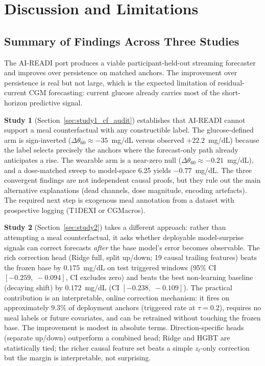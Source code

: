 \section{Discussion and Limitations}
\label{sec:discuss}

\subsection{Summary of Findings Across Three Studies}
\label{subsec:discuss_summary}

The AI-READI port produces a viable participant-held-out streaming forecaster
and improves over persistence on matched anchors.
The improvement over persistence is real but not large, which is the expected
limitation of residual-current CGM forecasting: current glucose already carries
most of the short-horizon predictive signal.

\textbf{Study 1} (Section~\ref{sec:study1_cf_audit}) establishes that AI-READI
cannot support a meal counterfactual with any constructible label.
The glucose-defined arm is sign-inverted ($\Delta\theta_{60} \approx -35$~mg/dL
versus observed $+22.2$~mg/dL) because the label selects precisely the anchors
where the forecast-only path already anticipates a rise.
The wearable arm is a near-zero null ($\Delta\theta_{60} \approx -0.21$~mg/dL),
and a dose-matched sweep to model-space 6.25 yields $-0.77$~mg/dL.
The three convergent findings are not independent causal proofs, but they rule out
the main alternative explanations (dead channels, dose magnitude, encoding artefacts).
The required next step is exogenous meal annotation from a dataset with prospective
logging (T1DEXI or CGMacros).

\textbf{Study 2} (Section~\ref{sec:study2}) takes a different approach: rather
than attempting a meal counterfactual, it asks whether deployable model-surprise
signals can correct forecasts \emph{after} the base model's error becomes
observable.
The rich correction head (Ridge full, split up/down; 19 causal trailing features)
beats the frozen base by $0.175$~mg/dL on test triggered windows
(95\% CI $[-0.259,\;-0.094]$, CI excludes zero) and beats the best
non-learning baseline (decaying shift) by $0.172$~mg/dL
(CI $[-0.238,\;-0.109]$).
The practical contribution is an interpretable, online correction mechanism:
it fires on approximately $9.3\%$ of deployment anchors (triggered rate at $\tau=0.2$),
requires no meal labels or future covariates, and can be retrained without
touching the frozen base.
The improvement is modest in absolute terms.
Direction-specific heads (separate up/down) outperform a combined head; Ridge
and HGBT are statistically tied; the richer causal feature set beats a simple
$z_t$-only correction but the margin is interpretable, not surprising.

